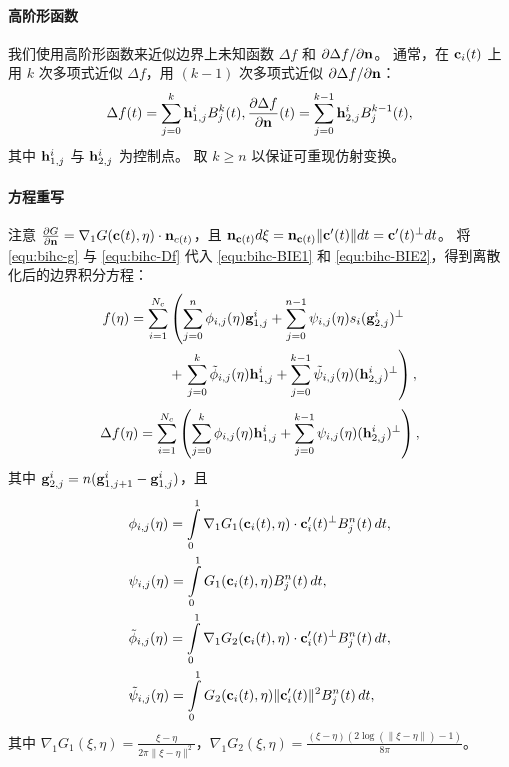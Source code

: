 \paragraph{高阶形函数}
我们使用高阶形函数来近似边界上未知函数 \(\Delta f\) 和 \(\partial \Delta f/\partial \mathbf{n}\)。
通常，在 \(\mathbf{c}_i(t)\) 上用 $k$ 次多项式近似 \(\Delta f\)，用 $(k-1)$ 次多项式近似 \(\partial \Delta f/\partial \mathbf{n}\)：
\begin{equation}\label{equ:bihc-Df}
\begin{aligned}
    \Delta f(t)=\sum_{j=0}^k \mathbf{h}_{1,j}^i B_j^k(t), \frac{\partial \Delta f}{\partial \mathbf{n}}(t)=\sum_{j=0}^{k-1} \mathbf{h}_{2,j}^i B_j^{k-1}(t),
    \end{aligned}
\end{equation}
其中 \(\mathbf{h}_{1,j}^i\) 与 \(\mathbf{h}_{2,j}^i\) 为控制点。
取 \(k \geq n\) 以保证可重现仿射变换。

\paragraph{方程重写}
注意 $\frac{\partial G}{\partial \mathbf{n}}=\nabla_1 G(\mathbf{c}(t),\eta)\cdot \mathbf{n}_{c(t)}$，且 $\mathbf{n}_{\mathbf{c}(t)} d\xi=\mathbf{n}_{\mathbf{c}(t)}\|\mathbf{c}'(t)\|dt=\mathbf{c}'(t)^{\perp}dt$。
将 \eqref{equ:bihc-g} 与 \eqref{equ:bihc-Df} 代入 \eqref{equ:bihc-BIE1} 和 \eqref{equ:bihc-BIE2}，得到离散化后的边界积分方程：
\begin{equation}\label{equ:bihc-dis_Int1}
\begin{aligned}
    f(\eta) = \sum_{i=1}^{N_c} &\left(\sum_{j =0}^n \phi_{i,j}(\eta) \mathbf{g}_{1,j}^i +  \sum_{j =0}^{n-1}\psi_{i,j}(\eta) s_i (\mathbf{g}_{2,j}^{i})^{\perp} \right.\\
&+\left. \sum_{j =0}^k \tilde{\phi}_{i,j}(\eta) \mathbf{h}_{1,j}^i +  \sum_{j =0}^{k-1}\tilde{\psi}_{i,j}(\eta) (\mathbf{h}_{2,j}^{i})^{\perp}\right),
\end{aligned}
\end{equation}
\begin{equation}\label{equ:bihc-dis_Int2}
   \Delta f(\eta) = \sum_{i=1}^{N_c} \left(\sum_{j =0}^k  \phi_{i,j}(\eta) \mathbf{h}_{1,j}^i + \sum_{j =0}^{k-1} \psi_{i,j}(\eta) (\mathbf{h}_{2,j}^{i})^{\perp}\right),
\end{equation}
其中 $\mathbf{g}_{2,j}^i=n(\mathbf{g}_{1,j+1}^i-\mathbf{g}_{1,j}^i)$，且
\begin{equation}\label{equ:bihc-basis_inte}
\begin{aligned}
   & \phi_{i,j}(\eta)=\int\limits_0^1\nabla_1 G_1(\mathbf{c}_i(t),\eta)\cdot \mathbf{c}_i'(t)^{\perp}B^n_j(t)\,dt,\\
   &\psi_{i,j}(\eta)=\int\limits_0^1 G_1(\mathbf{c}_i(t),\eta) B^n_j(t)\,dt,\\
   &\tilde{\phi}_{i,j}(\eta)=\int\limits_0^1\nabla_1 G_2(\mathbf{c}_i(t),\eta)\cdot \mathbf{c}_i'(t)^{\perp}B^n_j(t)\,dt,\\
   &\tilde{\psi}_{i,j}(\eta)=\int\limits_0^1 G_2(\mathbf{c}_i(t),\eta) \|\mathbf{c}_i'(t)\|^2 B^n_j(t)\,dt,
 \end{aligned}
\end{equation}
其中 $\nabla_1 G_1(\xi, \eta) = \frac{\xi - \eta}{2\pi \|\xi - \eta\|^2}$，$\nabla_1 G_2(\xi, \eta) = \frac{(\xi - \eta)(2 \log(\|\xi-\eta\|)-1)}{8\pi}$。
%
